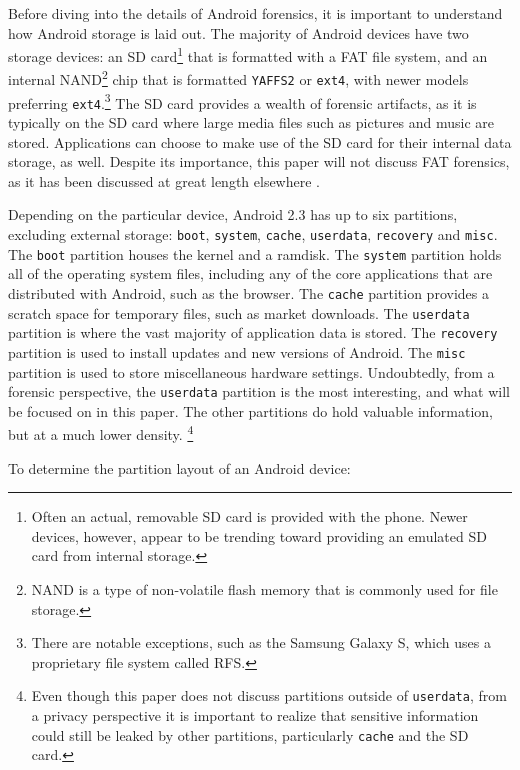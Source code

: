 Before diving into the details of Android forensics, it is important to understand how Android storage is laid out.  The majority of
Android devices have two storage devices: an SD card\footnote{Often an actual, removable SD card is provided with the phone. Newer
devices, however, appear to be trending toward providing an emulated SD card from internal storage.} that is formatted with a FAT
file system, and an internal NAND\footnote{NAND is a type of non-volatile flash memory that is commonly used for file storage.} chip
that is formatted \texttt{YAFFS2} or \texttt{ext4}, with newer models preferring \texttt{ext4}.\footnote{There are notable
exceptions, such as the Samsung Galaxy S, which uses a proprietary file system called RFS.} The SD card provides a wealth of forensic
artifacts, as it is typically on the SD card where large media files such as pictures and music are stored.  Applications can choose
to make use of the SD card for their internal data storage, as well.  Despite its importance, this paper will not discuss FAT
forensics, as it has been discussed at great length elsewhere \cite{carrier}. 

Depending on the particular device, Android 2.3 has up to six partitions, excluding external storage: \texttt{boot}, \texttt{system}, \texttt{cache}, \texttt{userdata},
\texttt{recovery} and \texttt{misc}. 
The \texttt{boot} partition houses the kernel and a ramdisk.
The \texttt{system} partition holds all of the operating system files, including any of the core applications that are distributed with Android, such as the browser. 
The \texttt{cache} partition provides a scratch space for temporary files, such as market downloads.
The \texttt{userdata} partition is where the vast majority of application data is stored.
The \texttt{recovery} partition is used to install updates and new versions of Android. 
The \texttt{misc} partition is used to store miscellaneous hardware settings.
Undoubtedly, from a forensic perspective, the \texttt{userdata} partition is the most interesting, and what will be focused on in
this paper. The other partitions do hold valuable information, but at a much lower density.
\footnote{Even though this paper does not discuss partitions outside of \texttt{userdata}, from a privacy perspective it is
important to realize that sensitive information could still be leaked by other partitions, particularly \texttt{cache} and the SD
card.}

To determine the partition layout of an Android device:

